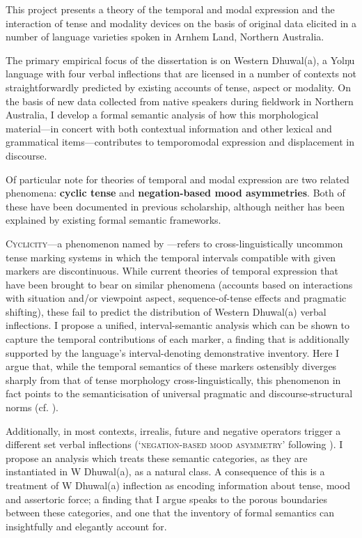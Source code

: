 This project presents a theory of the temporal and modal expression and the interaction of tense and modality devices on the basis of original data elicited in a number of language varieties spoken in Arnhem Land, Northern Australia.

The primary empirical focus of the dissertation is on Western Dhuwal(a), a Yolŋu language with four verbal inflections that are licensed in a number of contexts not straightforwardly predicted by existing accounts of tense, aspect or modality. On the basis of new data collected from native speakers during fieldwork in Northern Australia, I develop a formal semantic analysis of how this morphological material---in concert with both contextual information and other lexical and grammatical items---contributes to temporomodal expression and displacement in discourse. 

Of particular note for theories of temporal and modal expression are two related phenomena: \textbf{cyclic tense} and \textbf{negation-based mood asymmetries}. Both of these have been documented in previous scholarship, although neither has been explained by existing formal semantic frameworks.

 \textsc{Cyclicity}---a phenomenon named by \citet[91]{Comrie1983}%
 ---refers to cross-linguistically uncommon tense marking systems in which the temporal intervals compatible with given markers are discontinuous. 
While current theories of temporal expression that have been brought to bear on similar phenomena (accounts based on interactions with situation and/or viewpoint aspect, sequence-of-tense effects and pragmatic shifting), these fail to predict the distribution of Western Dhuwal(a) verbal inflections. I propose a unified, interval-semantic analysis which can be shown to capture the temporal contributions of each marker, a finding that is additionally supported by the language's interval-denoting demonstrative inventory. Here I argue that, while the temporal semantics of these markers ostensibly diverges sharply from that of tense morphology cross-linguistically, this phenomenon in fact points to the semanticisation of universal pragmatic and discourse-structural norms (cf. \citealt{Culioli1980}).
 
Additionally, in most contexts, irrealis, future and negative operators trigger a different set verbal inflections (`\textsc{negation-based mood asymmetry}' following \citealp{Miestamo2005}). I propose an analysis which treats these semantic categories, as they are instantiated in W Dhuwal(a), as a natural class. A consequence of this is a treatment of W Dhuwal(a) inflection as encoding information about tense, mood and assertoric force; a finding that I argue speaks to the porous boundaries between these categories, and one that the inventory of formal semantics can insightfully and elegantly account for.

